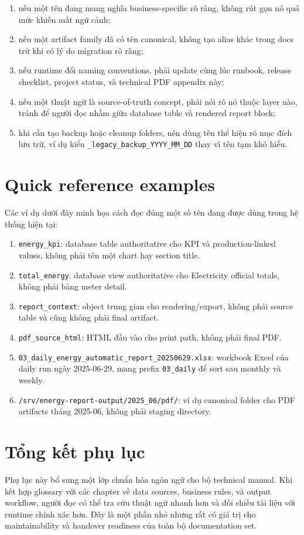 \begin{enumerate}[label=-]
\item nếu một tên đang mang nghĩa business-specific rõ ràng, không rút gọn nó quá mức khiến mất ngữ cảnh;
\item nếu một artifact family đã có tên canonical, không tạo alias khác trong docs trừ khi có lý do migration rõ ràng;
\item nếu runtime đổi naming conventions, phải update cùng lúc runbook, release checklist, project status, và technical PDF appendix này;
\item nếu một thuật ngữ là source-of-truth concept, phải nói rõ nó thuộc layer nào, tránh để người đọc nhầm giữa database table và rendered report block;
\item khi cần tạo backup hoặc cleanup folders, nên dùng tên thể hiện rõ mục đích lưu trữ, ví dụ kiểu \texttt{\_legacy\_backup\_YYYY\_MM\_DD} thay vì tên tạm khó hiểu.
\end{enumerate}

\section{Quick reference examples}

Các ví dụ dưới đây minh họa cách đọc đúng một số tên đang được dùng trong hệ thống hiện tại:

\begin{enumerate}[label=-]
\item \texttt{energy\_kpi}: database table authoritative cho KPI và production-linked values, không phải tên một chart hay section title.
\item \texttt{total\_energy}: database view authoritative cho Electricity official totals, không phải bảng meter detail.
\item \texttt{report\_context}: object trung gian cho rendering/export, không phải source table và cũng không phải final artifact.
\item \texttt{pdf\_source\_html}: HTML đầu vào cho print path, không phải final PDF.
\item \texttt{03\_daily\_energy\_automatic\_report\_20250629.xlsx}: workbook Excel của daily run ngày 2025-06-29, mang prefix \texttt{03\_daily} để sort sau monthly và weekly.
\item \texttt{/srv/energy-report-output/2025\_06/pdf/}: ví dụ canonical folder cho PDF artifacts tháng 2025-06, không phải staging directory.
\end{enumerate}

\section{Tổng kết phụ lục}

Phụ lục này bổ sung một lớp chuẩn hóa ngôn ngữ cho bộ technical manual. Khi kết hợp glossary với các chapter về data sources, business rules, và output workflow, người đọc có thể tra cứu thuật ngữ nhanh hơn và đối chiếu tài liệu với runtime chính xác hơn. Đây là một phần nhỏ nhưng rất có giá trị cho maintainability và handover readiness của toàn bộ documentation set.
